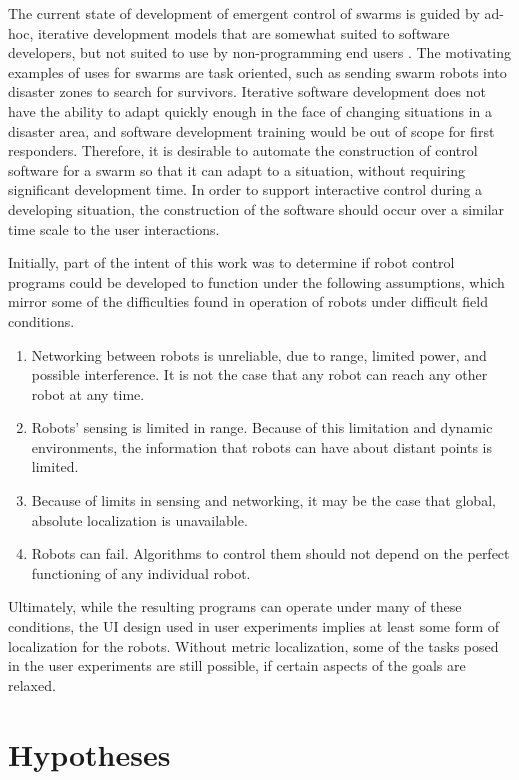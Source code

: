 The current state of development of emergent control of swarms is guided by ad-hoc, iterative development models that are somewhat suited to software developers, but not suited to use by non-programming end users \citep{palmer2005behavioral}.
The motivating examples of uses for swarms are task oriented, such as sending swarm robots into disaster zones to search for survivors.
Iterative software development does not have the ability to adapt quickly enough in the face of changing situations in a disaster area, and software development training would be out of scope for first responders. Therefore, it is desirable to automate the construction of control software for a swarm so that it can adapt to a situation, without requiring significant development time. 
In order to support interactive control during a developing situation, the construction of the software should occur over a similar time scale to the user interactions.

Initially, part of the intent of this work was to determine if robot control programs could be developed to function under the following assumptions, which mirror some of the difficulties found in operation of robots under difficult field conditions. 

\begin{enumerate}
	\item Networking between robots is unreliable, due to range, limited power, and possible interference. It is not the case that any robot can reach any other robot at any time.
	\item Robots' sensing is limited in range. Because of this limitation and dynamic environments, the information that robots can have about distant points is limited. 
	\item Because of limits in sensing and networking, it may be the case that global, absolute localization is unavailable. 
	\item Robots can fail. Algorithms to control them should not depend on the perfect functioning of any individual robot. 
\end{enumerate}

Ultimately, while the resulting programs can operate under many of these conditions, the UI design used in user experiments implies at least some form of localization for the robots.
Without metric localization, some of the tasks posed in the user experiments are still possible, if certain aspects of the goals are relaxed. 

\section{Hypotheses} \label{section:Hypotheses}

